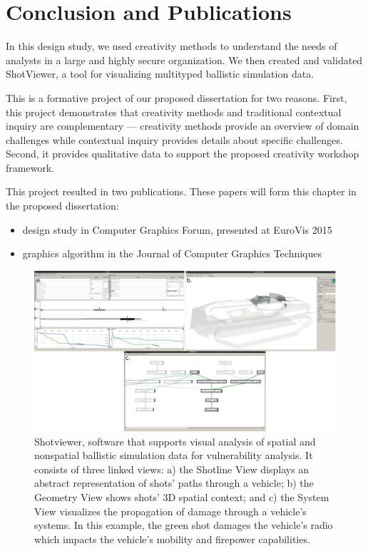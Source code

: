 \section{Conclusion and Publications}

In this design study, we used creativity methods to understand the needs of analysts in a large and highly secure organization. We then created and validated ShotViewer, a tool for visualizing multityped ballistic simulation data. 

This is a formative project of our proposed dissertation for two reasons. First, this project demonstrates that creativity methods and traditional contextual inquiry are complementary --- creativity methods provide an overview of domain challenges while contextual inquiry provides details about specific challenges. Second, it provides qualitative data to support the proposed creativity workshop framework. 

This project resulted in two publications. These papers will form this chapter in the proposed dissertation:

\begin{itemize}
    \item design study in Computer Graphics Forum, presented at EuroVis 2015 ~\cite{Kerzner2015}
    \item graphics algorithm in the Journal of Computer Graphics Techniques~\cite{Gribble2014}
\end{itemize}


\begin{figure}
 \includegraphics[width=\linewidth]{sources/figures/03_shotviewer}
  \caption{Shotviewer, software that supports visual analysis of spatial and nonspatial ballistic simulation data for vulnerability analysis. It consists of three linked views: a) the Shotline View displays an abstract representation of shots' paths through a vehicle; b) the Geometry View shows shots' 3D spatial context; and c) the System View visualizes the propagation of damage through a vehicle's systems. In this example, the green shot damages the vehicle's radio which impacts the vehicle's mobility and firepower capabilities.}
\label{fig:03_shotviewer}
\end{figure}
